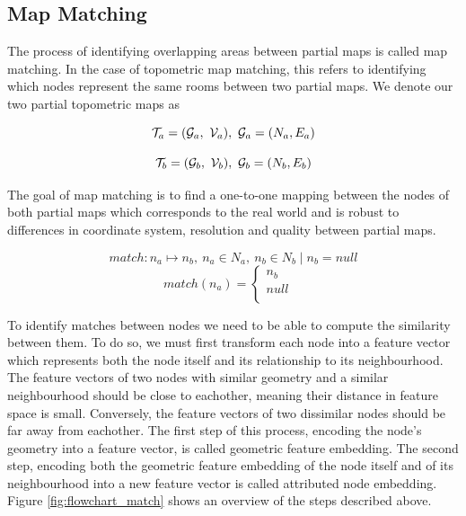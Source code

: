 \subsection{Map Matching}
The process of identifying overlapping areas between partial maps is called map matching. In the case of topometric map matching, this refers to identifying which nodes represent the same rooms between two partial maps. We denote our two partial topometric maps as

\begin{equation}
    \label{eq:tmap_a}
    \topometricmap_a = (\mathcal{G}_a,\ \voxelgrid_a),\ \mathcal{G}_a=(N_a,E_a)
\end{equation}

\begin{equation}
    \label{eq:tmap_b}
    \topometricmap_b = (\mathcal{G}_b,\ \voxelgrid_b),\ \mathcal{G}_b=(N_b,E_b)
\end{equation}

The goal of map matching is to find a one-to-one mapping between the nodes of both partial maps  which corresponds to the real world and is robust to differences in coordinate system, resolution and quality between partial maps. 

\begin{equation}
    \label{eq:match_01}
    match: n_a \mapsto n_b,\ n_a \in N_a,\ n_b \in N_b \mid n_b = null
\end{equation}
\begin{equation}
    \label{eq:match_02}
    match(n_a) = 
    \begin{cases}
        n_b & \\
        null & \\
    \end{cases}
\end{equation}

To identify matches between nodes we need to be able to compute the similarity between them. To do so, we must first transform each node into a feature vector which represents both the node itself and its relationship to its neighbourhood. The feature vectors of two nodes with similar geometry and a similar neighbourhood should be close to eachother, meaning their distance in feature space is small. Conversely, the feature vectors of two dissimilar nodes should be far away from eachother. The first step of this process, encoding the node's geometry into a feature vector, is called geometric feature embedding. The second step, encoding both the geometric feature embedding of the node itself and of its neighbourhood into a new feature vector is called attributed node embedding. Figure \ref{fig:flowchart_match} shows an overview of the steps described above.

